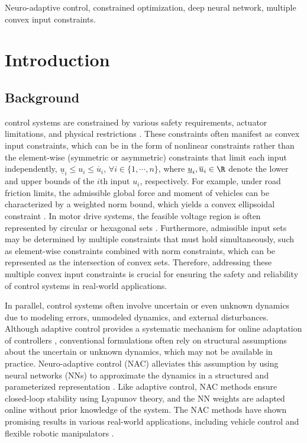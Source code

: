 \documentclass[letterpaper, journal]{IEEEtran}
\begin{document}
\begin{IEEEkeywords}
  Neuro-adaptive control, constrained optimization, deep neural network,  multiple convex input constraints.
\end{IEEEkeywords}

\section{Introduction}

\subsection{Background}

 control systems are constrained by various safety requirements, actuator limitations, and physical restrictions \cite{Ji:2025aa}.
These constraints often manifest as convex input constraints, which can be in the form of nonlinear constraints rather than the element-wise (symmetric or asymmetric) constraints that limit each input independently, \ie $\underline{u}_i\le u_i\le\overline{u}_i$, $\forall i\in\{1,\cdots,n\}$, where $\underline{u}_i,\overline{u}_i\in\R$ denote the lower and upper bounds of the $i$th input $u_i$, respectively.
For example, under road friction limits, the admissible global force and moment of vehicles can be characterized by a weighted norm bound, which yields a convex ellipsoidal constraint \cite{Chen:2024aa}.
In motor drive systems, the feasible voltage region is often represented by circular \cite{Ryu:2025aa} or hexagonal sets \cite{Monzen:2026aa}.
Furthermore, admissible input sets may be determined by multiple constraints that must hold simultaneously, such as element-wise constraints combined with norm constraints, which can be represented as the intersection of convex sets.
Therefore, addressing these multiple convex input constraints is crucial for ensuring the safety and reliability of control systems in real-world applications.

In parallel, control systems often involve uncertain or even unknown dynamics due to modeling errors, unmodeled dynamics, and external disturbances.
Although adaptive control provides a systematic mechanism for online adaptation of controllers \cite{Ioannou:2006aa}, conventional formulations often rely on structural assumptions about the uncertain or unknown dynamics, which may not be available in practice.
Neuro-adaptive control (NAC) alleviates this assumption by using neural networks (NNs) to approximate the dynamics in a structured and parameterized representation \cite{Farrell:2006aa,Patil:2022aa}.
Like adaptive control, NAC methods ensure closed-loop stability using Lyapunov theory, and the NN weights are adapted online without prior knowledge of the system.
The NAC methods have shown promising results in various real-world applications, including vehicle control \cite{You:2023aa} and flexible robotic manipulators \cite{Gao:2026aa}.
\end{document}
